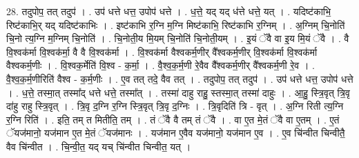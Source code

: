 \documentclass[17pt]{extarticle}
\begin{document}
28. तदुपोप॒ तत् तदुप॑ । . उप॑ धत्ते धत्त॒ उपोप॑ धत्ते । . ध॒त्ते॒ यद् यद् ध॑त्ते धत्ते॒ यत् । . यदिष्ट॑काभि॒ रिष्ट॑काभि॒र् यद् यदिष्ट॑काभिः । . इष्ट॑काभि र॒ग्नि म॒ग्नि मिष्ट॑काभि॒ रिष्ट॑काभि र॒ग्निम् । . अ॒ग्निम् चि॒नोति॑ चि॒नो त्य॒ग्नि म॒ग्निम् चि॒नोति॑ । . चि॒नोती॒य मि॒यम् चि॒नोति॑ चि॒नोती॒यम् । . इ॒यं ॅवै वा इ॒य मि॒यं ॅवै । . वै वि॒श्वक॑र्मा वि॒श्वक॑र्मा॒ वै वै वि॒श्वक॑र्मा । . वि॒श्वक॑र्मा वैश्वकर्म॒णीर् वै᳚श्वकर्म॒णीर् वि॒श्वक॑र्मा वि॒श्वक॑र्मा वैश्वकर्म॒णीः । . वि॒श्वक॒र्मेति॑ वि॒श्व - क॒र्मा॒ । . वै॒श्व॒क॒र्म॒णी रे॒वैव वै᳚श्वकर्म॒णीर् वै᳚श्वकर्म॒णी रे॒व । . वै॒श्व॒क॒र्म॒णीरिति॑ वैश्व - क॒र्म॒णीः । . ए॒व तत् तदे॒ वैव तत् । . तदुपोप॒ तत् तदुप॑ । . उप॑ धत्ते धत्त॒ उपोप॑ धत्ते । . ध॒त्ते॒ तस्मा॒त् तस्मा᳚द् धत्ते धत्ते॒ तस्मा᳚त् । . तस्मा॑ दाहु राहु॒ स्तस्मा॒त् तस्मा॑ दाहुः । . आ॒हु॒ स्त्रि॒वृत् त्रि॒वृ दा॑हु राहु स्त्रि॒वृत् । . त्रि॒वृ द॒ग्नि र॒ग्नि स्त्रि॒वृत् त्रि॒वृ द॒ग्निः । . त्रि॒वृदिति॑ त्रि - वृत् । . अ॒ग्नि रिती त्य॒ग्नि र॒ग्नि रिति॑ । . इति॒ तम् त मितीति॒ तम् । . तं ॅवै वै तम् तं ॅवै । . वा ए॒त मे॒तं ॅवै वा ए॒तम् । . ए॒तं ॅयज॑मानो॒ यज॑मान ए॒त मे॒तं ॅयज॑मानः । . यज॑मान ए॒वैव यज॑मानो॒ यज॑मान ए॒व । . ए॒व चि॑न्वीत चिन्वीतै॒ वैव चि॑न्वीत । . चि॒न्वी॒त॒ यद् यच् चि॑न्वीत चिन्वीत॒ यत् । \newline
\end{document}
